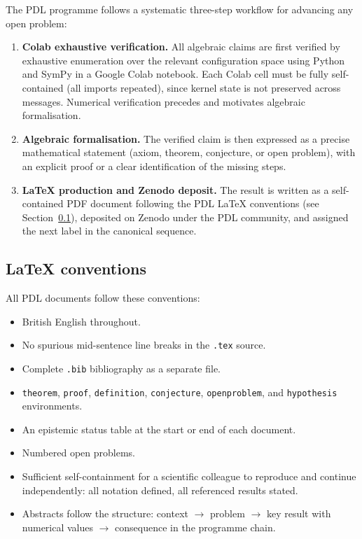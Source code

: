 \documentclass[11pt,a4paper]{article}
\theoremstyle{plain}
\theoremstyle{definition}
\theoremstyle{remark}
\begin{document}
The PDL programme follows a systematic three-step workflow for advancing any open problem:
\begin{enumerate}
\item \textbf{Colab exhaustive verification.}
All algebraic claims are first verified by exhaustive enumeration over the relevant configuration space using Python and SymPy in a Google Colab notebook.
Each Colab cell must be fully self-contained (all imports repeated), since kernel state is not preserved across messages.
Numerical verification precedes and motivates algebraic formalisation.
\item \textbf{Algebraic formalisation.}
The verified claim is then expressed as a precise mathematical statement (axiom, theorem, conjecture, or open problem), with an explicit proof or a clear identification of the missing steps.
\item \textbf{LaTeX production and Zenodo deposit.}
The result is written as a self-contained PDF document following the PDL LaTeX conventions (see Section~\ref{subsec:latex}), deposited on Zenodo under the PDL community, and assigned the next label in the canonical sequence.
\end{enumerate}

\subsection{LaTeX conventions}
\label{subsec:latex}

All PDL documents follow these conventions:
\begin{itemize}
\item British English throughout.
\item No spurious mid-sentence line breaks in the \texttt{.tex} source.
\item Complete \texttt{.bib} bibliography as a separate file.
\item \texttt{theorem}, \texttt{proof}, \texttt{definition}, \texttt{conjecture}, \texttt{openproblem}, and \texttt{hypothesis} environments.
\item An epistemic status table at the start or end of each document.
\item Numbered open problems.
\item Sufficient self-containment for a scientific colleague to reproduce and continue independently: all notation defined, all referenced results stated.
\item Abstracts follow the structure: context $\to$ problem $\to$ key result with numerical values $\to$ consequence in the programme chain.
\end{itemize}
\end{document}
